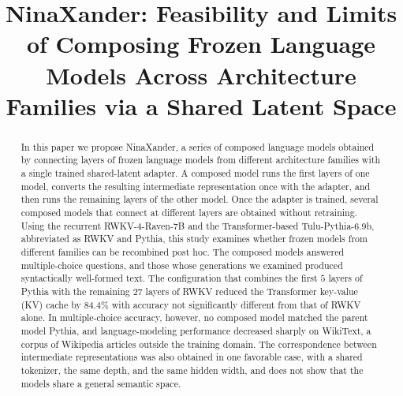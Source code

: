 \documentclass[conference]{IEEEtran}
\newcommand{\kw}[1]{#1}
\begin{document}
\title{NinaXander: Feasibility and Limits of Composing Frozen Language Models Across Architecture Families via a Shared Latent Space}

\author{
\and
{}
}

\maketitle

\begin{abstract}
In this paper we propose \kw{NinaXander}, a series of composed language models obtained by connecting layers of frozen language
models from different architecture families with a single trained shared-latent adapter.
A composed model runs the first layers of one model, converts the resulting intermediate representation once with the adapter,
and then runs the remaining layers of the other model.
Once the adapter is trained, several composed models that connect at different layers are obtained without retraining.
Using the recurrent RWKV-4-Raven-7B and the Transformer-based Tulu-Pythia-6.9b, abbreviated as RWKV and Pythia, this study examines whether frozen models from
different families can be recombined post hoc.
The composed models answered multiple-choice questions, and those whose generations we examined produced syntactically well-formed text.
The configuration that combines the first $5$ layers of Pythia with the
remaining $27$ layers of RWKV reduced the Transformer key-value (KV) cache by $84.4\%$ with accuracy not significantly
different from that of RWKV alone. In multiple-choice accuracy, however, no composed model matched the parent model Pythia, and language-modeling
performance decreased sharply on WikiText, a corpus of Wikipedia articles outside the training domain. The correspondence between intermediate representations was also
obtained in one favorable case, with a shared tokenizer, the same depth, and the same hidden width, and does not show that the models share
a general semantic space.
\end{abstract}
\end{document}
